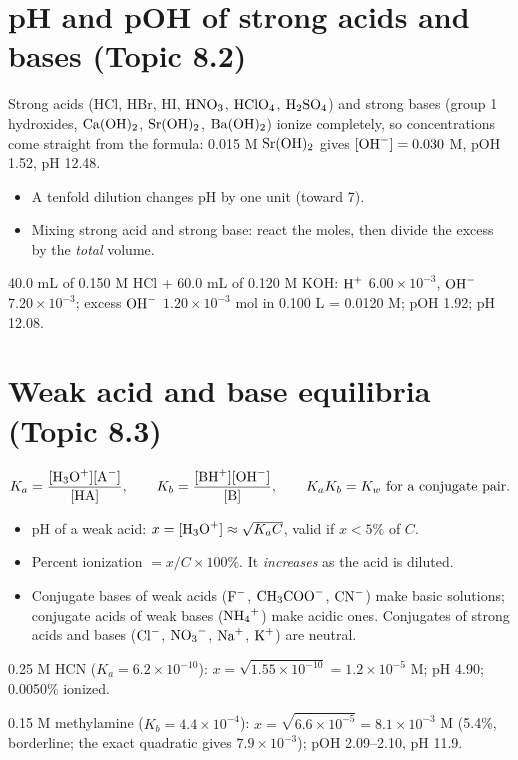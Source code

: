 \documentclass[11pt]{article}
\begin{document}
\section{pH and pOH of strong acids and bases (Topic 8.2)}\label{t:8.2}
Strong acids (HCl, HBr, HI, $\ce{HNO3}$, $\ce{HClO4}$, $\ce{H2SO4}$) and strong bases (group 1 hydroxides, $\ce{Ca(OH)2}$, $\ce{Sr(OH)2}$, $\ce{Ba(OH)2}$) ionize completely, so concentrations come straight from the formula: 0.015 M $\ce{Sr(OH)2}$ gives $[\ce{OH-}] = 0.030$ M, pOH 1.52, pH 12.48.
\begin{itemize}
\item A tenfold dilution changes pH by one unit (toward 7).
\item Mixing strong acid and strong base: react the moles, then divide the excess by the \emph{total} volume.
\end{itemize}
 40.0 mL of 0.150 M HCl + 60.0 mL of 0.120 M KOH: $\ce{H+}$ $6.00\times10^{-3}$, $\ce{OH-}$ $7.20\times10^{-3}$; excess $\ce{OH-}$ $1.20\times10^{-3}$ mol in 0.100 L = 0.0120 M; pOH 1.92; pH 12.08.

\section{Weak acid and base equilibria (Topic 8.3)}\label{t:8.3}
\[ K_a = \frac{[\ce{H3O+}][\ce{A-}]}{[\ce{HA}]}, \qquad K_b = \frac{[\ce{BH+}][\ce{OH-}]}{[\ce{B}]}, \qquad K_aK_b = K_w \text{ for a conjugate pair.} \]
\begin{itemize}
\item pH of a weak acid: $x = [\ce{H3O+}] \approx \sqrt{K_aC}$, valid if $x < 5\%$ of $C$.
\item Percent ionization $= x/C \times 100\%$. It \emph{increases} as the acid is diluted.
\item Conjugate bases of weak acids ($\ce{F-}$, $\ce{CH3COO-}$, $\ce{CN-}$) make basic solutions; conjugate acids of weak bases ($\ce{NH4+}$) make acidic ones. Conjugates of strong acids and bases ($\ce{Cl-}$, $\ce{NO3-}$, $\ce{Na+}$, $\ce{K+}$) are neutral.
\end{itemize}
 0.25 M HCN ($K_a = 6.2\times10^{-10}$): $x = \sqrt{1.55\times10^{-10}} = 1.2\times10^{-5}$ M; pH 4.90; 0.0050\% ionized.

 0.15 M methylamine ($K_b = 4.4\times10^{-4}$): $x = \sqrt{6.6\times10^{-5}} = 8.1\times10^{-3}$ M (5.4\%, borderline; the exact quadratic gives $7.9\times10^{-3}$); pOH 2.09--2.10, pH 11.9.
\end{document}
